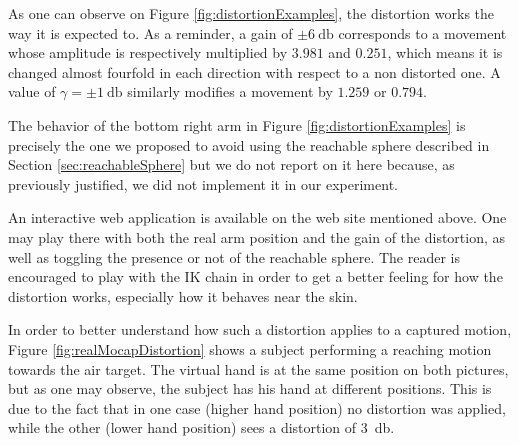 As one can observe on Figure \ref{fig:distortionExamples}, the distortion works the way it is expected to. As a reminder, a gain of $\pm\SI{6}{\decibel}$ corresponds to a movement whose amplitude is respectively multiplied by $3.981$ and $0.251$, which means it is changed almost fourfold in each direction with respect to a non distorted one. A value of $\gamma = \pm\SI{1}{\decibel}$ similarly modifies a movement by $1.259$ or $0.794$.

The behavior of the bottom right arm in Figure \ref{fig:distortionExamples} is precisely the one we proposed to avoid using the reachable sphere described in Section \ref{sec:reachableSphere} but we do not report on it here because, as previously justified, we did not implement it in our experiment.

An interactive web application is available on the web site mentioned above. One may play there with both the real arm position and the gain of the distortion, as well as toggling the presence or not of the reachable sphere. The reader is encouraged to play with the IK chain in order to get a better feeling for how the distortion works, especially how it behaves near the skin.

In order to better understand how such a distortion applies to a captured motion, Figure \ref{fig:realMocapDistortion} shows a subject performing a reaching motion towards the air target. The virtual hand is at the same position on both pictures, but as one may observe, the subject has his hand at different positions. This is due to the fact that in one case (higher hand position) no distortion was applied, while the other (lower hand position) sees a distortion of \SI{3}{\decibel}.

